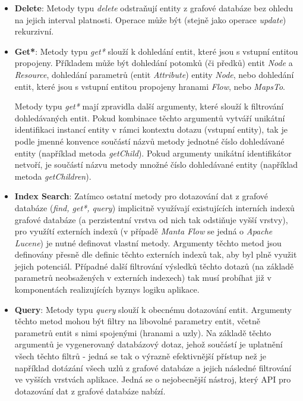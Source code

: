 \begin{itemize}
   \item{\textbf{Delete}}: Metody typu \textit{delete} odstraňují entity z grafové databáze bez ohledu na jejich interval platnosti. Operace může být (stejně jako operace \textit{update}) rekurzivní.

   \item{\textbf{Get*}}: Metody typu \textit{get*} slouží k dohledání entit, které jsou s vstupní entitou propojeny. Příkladem může být dohledání potomků (či předků) entit \textit{Node} a \textit{Resource}, dohledání parametrů (entit \textit{Attribute}) entity \textit{Node}, nebo dohledání entit, které jsou s vstupní entitou propojeny hranami \textit{Flow}, nebo \textit{MapsTo}.

   Metody typu \textit{get*} mají zpravidla další argumenty, které slouží k filtrování dohledávaných entit. Pokud kombinace těchto argumentů vytváří unikátní identifikaci instancí entity v rámci kontextu dotazu (vstupní entity), tak je podle jmenné konvence součástí názvů metody jednotné číslo dohledávané entity (například metoda \textit{getChild}). Pokud argumenty unikátní identifikátor netvoří, je součástí názvu metody množné číslo dohledávané entity (například metoda \textit{getChildren}).

   \item{\textbf{Index Search}}: Zatímco ostatní metody pro dotazování dat z grafové databáze (\textit{find, get*, query}) implicitně využívají existujících interních indexů grafové databáze (a perzistentní vrstva od nich tak odstiňuje vyšší vrstvy), pro využítí externích indexů (v případě \textit{Manta Flow} se jedná o \textit{Apache Lucene}) je nutné definovat vlastní metody. Argumenty těchto metod jsou definovány přesně dle definic těchto externích indexů tak, aby byl plně využit jejich potenciál. Případné další filtrování výsledků těchto dotazů (na základě parametrů neobsažených v externích indexech) tak musí probíhat již v komponentách realizujících byznys logiku aplikace.

   \item{\textbf{Query}}: Metody typu \textit{query} slouží k obecnému dotazování entit. Argumenty těchto metod mohou být filtry  na libovolné parametry entit, včetně parametrů entit s nimi spojenými (hranami a uzly). Na základě těchto argumentů je vygenerovaný databázový dotaz, jehož součástí je uplatnění všech těchto filtrů - jedná se tak o výrazně efektivnější přístup než je například dotázání všech uzlů z grafové databáze a jejich následné filtrování ve vyšších vrstvách aplikace. Jedná se o nejobecnější nástroj, který API pro dotazování dat z grafové databáze nabízí.
\end{itemize}


